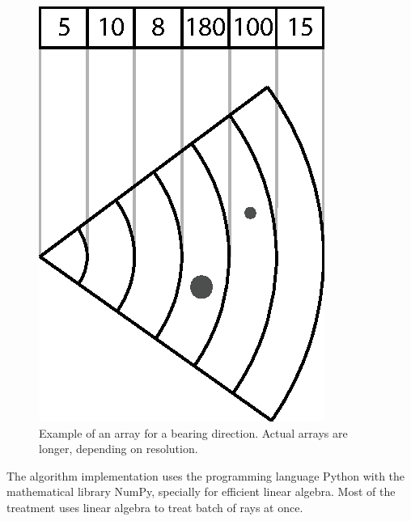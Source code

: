 \begin{figure}[h]
	\centering
	\includegraphics[scale=1.,clip]{Chap2/fig/sonarresponse.eps}
	\caption{Example of an array for a bearing direction. Actual arrays are
	longer, depending on resolution.}
	\label{fig:bins}
\end{figure}

The algorithm implementation uses the programming language Python with the
mathematical library NumPy, specially for efficient linear algebra. Most of the
treatment uses linear algebra to treat batch of rays at once.

